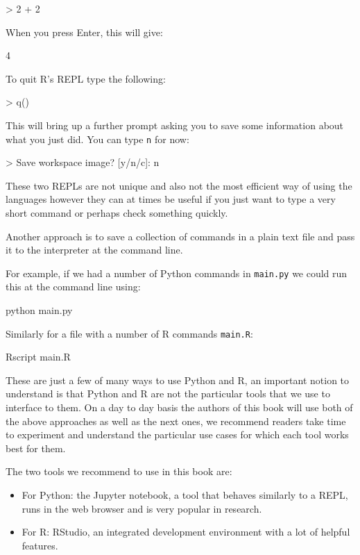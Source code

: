\begin{Rin}
> 2 + 2
\end{Rin}

When you press Enter, this will give:

\begin{Rout}
4
\end{Rout}

To quit R's REPL type the following:

\begin{Rin}
> q()
\end{Rin}

This will bring up a further prompt asking you to save some information about
what you just did. You can type \texttt{n} for now:

\begin{Rin}
> Save workspace image? [y/n/c]: n
\end{Rin}

These two REPLs are not unique and also not the most efficient way of using the
languages however they can at times be useful if you just want to type a very
short command or perhaps check something quickly.

Another approach is to save a collection of commands in a plain text file and
pass it to the interpreter at the command line.

For example, if we had a number of Python commands in \texttt{main.py}
we could run this at the command line using:

\begin{cliin}
python main.py
\end{cliin}

Similarly for a file with a number of R commands \texttt{main.R}:

\begin{cliin}
Rscript main.R
\end{cliin}

These are just a few of many ways to use Python and R, an important notion to
understand is that Python and R are not the particular tools that we use to
interface to them. On a day to day basis the authors of this book will use both
of the above approaches as well as the next ones, we recommend readers take time
to experiment and understand the particular use cases for which each tool works
best for them.

The two tools we recommend to use in this book are:

\begin{itemize}
    \item For Python: the Jupyter notebook, a tool that behaves similarly to a
        REPL, runs in the web browser and is very popular in research.
    \item For R: RStudio, an integrated development environment with a lot of
        helpful features.
\end{itemize}

